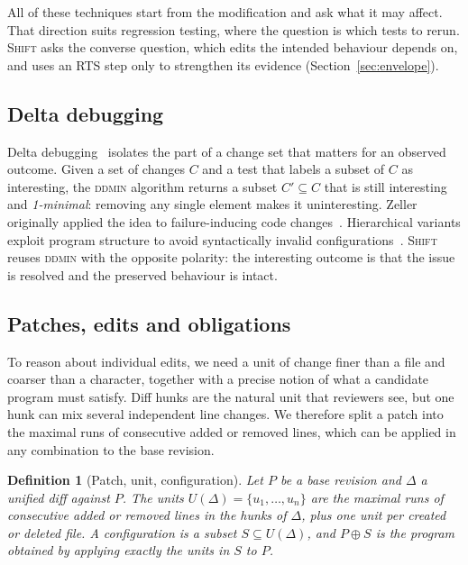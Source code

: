 \documentclass[a4paper,fleqn]{cas-sc}
\newcommand{\tool}{\textsc{Shift}}
\newtheorem{definition}{Definition}
\begin{document}
All of these techniques start from the modification and ask what it may affect. That direction suits regression testing, where the question is which tests to rerun. \tool{} asks the converse question, which edits the intended behaviour depends on, and uses an RTS step only to strengthen its evidence (Section~\ref{sec:envelope}).

\subsection{Delta debugging}\label{sec:bg-dd}
Delta debugging~\citep{zeller1999yesterday,zeller2002ddmin} isolates the part of a change set that matters for an observed outcome. Given a set of changes $C$ and a test that labels a subset of $C$ as interesting, the \textsc{ddmin} algorithm returns a subset $C' \subseteq C$ that is still interesting and \emph{1-minimal}: removing any single element makes it uninteresting. Zeller originally applied the idea to failure-inducing code changes~\citep{zeller1999yesterday}. Hierarchical variants exploit program structure to avoid syntactically invalid configurations~\citep{misherghi2006hdd}. \tool{} reuses \textsc{ddmin} with the opposite polarity: the interesting outcome is that the issue is resolved and the preserved behaviour is intact.

\subsection{Patches, edits and obligations}\label{sec:bg-defs}
To reason about individual edits, we need a unit of change finer than a file and coarser than a character, together with a precise notion of what a candidate program must satisfy. Diff hunks are the natural unit that reviewers see, but one hunk can mix several independent line changes. We therefore split a patch into the maximal runs of consecutive added or removed lines, which can be applied in any combination to the base revision.

\begin{definition}[Patch, unit, configuration]\label{def:units}
Let $P$ be a base revision and $\Delta$ a unified diff against $P$. The \emph{units} $U(\Delta)=\{u_1,\dots,u_n\}$ are the maximal runs of consecutive added or removed lines in the hunks of $\Delta$, plus one unit per created or deleted file. A \emph{configuration} is a subset $S\subseteq U(\Delta)$, and $P\oplus S$ is the program obtained by applying exactly the units in $S$ to $P$.
\end{definition}
\end{document}
